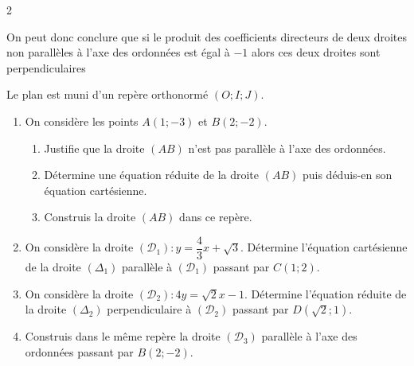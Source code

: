 \begin{multicols*}{2}
\begin{enumerate}
  		On peut donc conclure que si le produit des coefficients directeurs de deux droites non parallèles à l'axe des ordonnées est égal à $ -1 $ alors ces deux droites sont perpendiculaires
  	\end{enumerate}
  	
  	
  	Le plan est muni d'un repère orthonormé $\left(O; I;J\right)$. 
  	\begin{enumerate}
  		\item On considère les points $A(1;-3)$ et  $B(2;-2)$. 
  		\begin{enumerate} 
  			\item Justifie que la droite $(AB)$ n'est pas parallèle à l'axe des ordonnées.
  			\item Détermine une équation réduite de la droite $(AB)$ puis déduis-en son équation cartésienne.
  			\item  Construis la droite $(AB)$ dans ce repère.
  		\end{enumerate}
  		\item   On considère la droite $(\mathcal{D}_{1}): y=\dfrac{4}{3}x+\sqrt{3}$. Détermine l'équation cartésienne de la droite $({\Delta}_{1})$ parallèle à  $(\mathcal{D}_{1})$ passant par $C(1;2)$.
  		\item On considère la droite $(\mathcal{D}_{2}): 4y=\sqrt{2}x-1$. Détermine l'équation réduite de la droite $({\Delta}_{2})$ perpendiculaire à  $(\mathcal{D}_{2})$ passant par $D(\sqrt{2};1)$.
  		\item Construis dans le même repère la droite $(\mathcal{D}_{3})$ parallèle à l'axe des ordonnées passant par $B(2;-2)$.
  	\end{enumerate}
  	

\end{multicols*}
